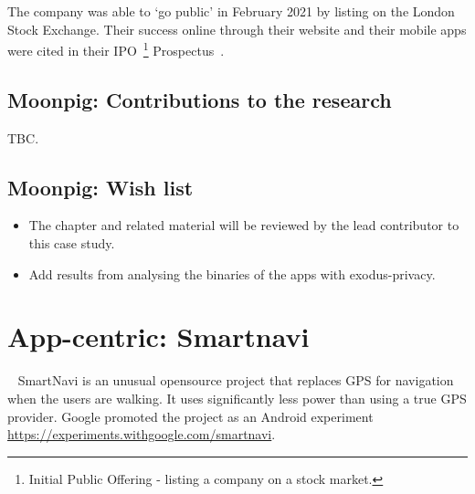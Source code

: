 The company was able to `go public' in February 2021 by listing on the London Stock Exchange.  Their success online through their website and their mobile apps were cited in their IPO~\footnote{Initial Public Offering - listing a company on a stock market.} Prospectus~\citep[p.92]{moonpig2021_ipo_prospectus}.

\subsection{Moonpig: Contributions to the research}
TBC.

\subsection*{Moonpig: Wish list}
{\small
\begin{itemize}
    \item The chapter and related material will be reviewed by the lead contributor to this case study.
    \item Add results from analysing the binaries of the apps with exodus-privacy.
\end{itemize}
}
\clearpage


\section{App-centric: Smartnavi}~\label{case-study-overview-smartnavi} 
SmartNavi is an unusual opensource project that replaces GPS for navigation when the users are walking. It uses significantly less power than using a true GPS provider. Google promoted the project as an Android experiment \url{https://experiments.withgoogle.com/smartnavi}.

